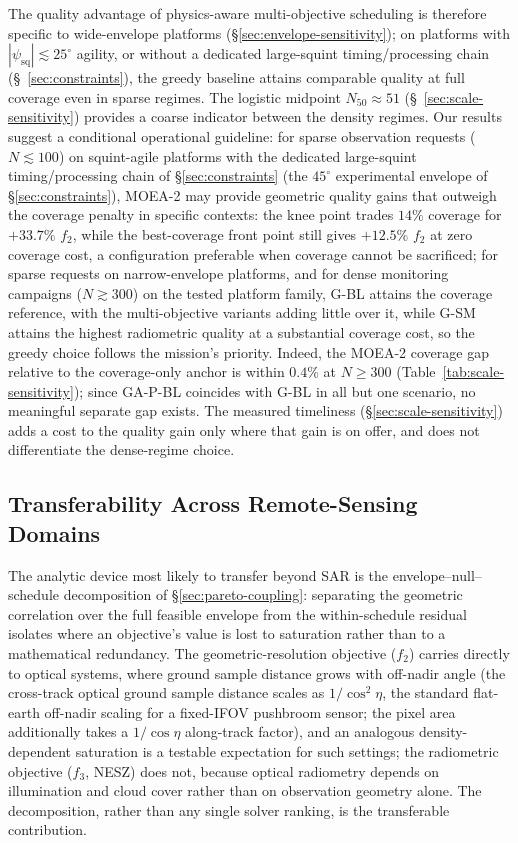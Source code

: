 \documentclass[preprint,12pt,authoryear]{elsarticle}
\begin{document}
The quality advantage of physics-aware multi-objective scheduling is therefore
specific to wide-envelope platforms (\S\ref{sec:envelope-sensitivity}); on
platforms with $|\psi_{\text{sq}}| \lesssim 25^\circ$ agility, or without a
dedicated large-squint timing/processing chain (\S~\ref{sec:constraints}),
the greedy baseline attains comparable quality at full coverage even in
sparse regimes. The logistic midpoint
$N_{50} \approx 51$ (\S~\ref{sec:scale-sensitivity}) provides a coarse
indicator between the density regimes. Our results suggest a conditional
operational guideline: for sparse observation requests ($N \lesssim 100$)
on squint-agile platforms with the dedicated large-squint timing/processing
chain of \S\ref{sec:constraints} (the $45^\circ$ experimental envelope of
\S\ref{sec:constraints}), MOEA-2 may provide geometric quality gains
that outweigh the coverage penalty in specific contexts: the knee point
trades $14\%$ coverage for $+33.7\%$ $f_2$, while the best-coverage front
point still gives $+12.5\%$ $f_2$ at zero coverage cost, a configuration
preferable when coverage cannot be sacrificed; for sparse requests on
narrow-envelope platforms, and for dense monitoring campaigns
($N \gtrsim 300$) on the tested platform family, G-BL attains the coverage
reference, with the multi-objective variants adding little over it, while
G-SM attains the highest radiometric quality at a substantial coverage cost,
so the greedy choice follows the mission's priority. Indeed, the
MOEA-2 coverage gap relative to the coverage-only anchor is
within $0.4\%$ at $N \geq 300$ (Table~\ref{tab:scale-sensitivity}); since GA-P-BL
coincides with G-BL in all but one scenario, no meaningful separate gap
exists. The measured timeliness (\S\ref{sec:scale-sensitivity}) adds a cost to
the quality gain only where that gain is on offer, and does not
differentiate the dense-regime choice.

\subsection{Transferability Across Remote-Sensing Domains}
The analytic device most likely to transfer beyond SAR is the
envelope--null--schedule decomposition of \S\ref{sec:pareto-coupling}: separating
the geometric correlation over the full feasible envelope from the
within-schedule residual isolates where an objective's value is lost to
saturation rather than to a mathematical redundancy. The geometric-resolution
objective ($f_2$) carries directly to optical systems, where ground sample
distance grows with off-nadir angle (the cross-track optical ground sample
distance scales as $1/\cos^2\eta$, the standard flat-earth off-nadir scaling
for a fixed-IFOV pushbroom sensor; the pixel area additionally takes a
$1/\cos\eta$ along-track factor), and an analogous density-dependent
saturation is a testable expectation for such settings; the radiometric objective ($f_3$, NESZ) does not,
because optical radiometry depends on illumination and cloud cover rather
than on observation geometry alone. The decomposition, rather than any
single solver ranking, is the transferable contribution.
\end{document}
